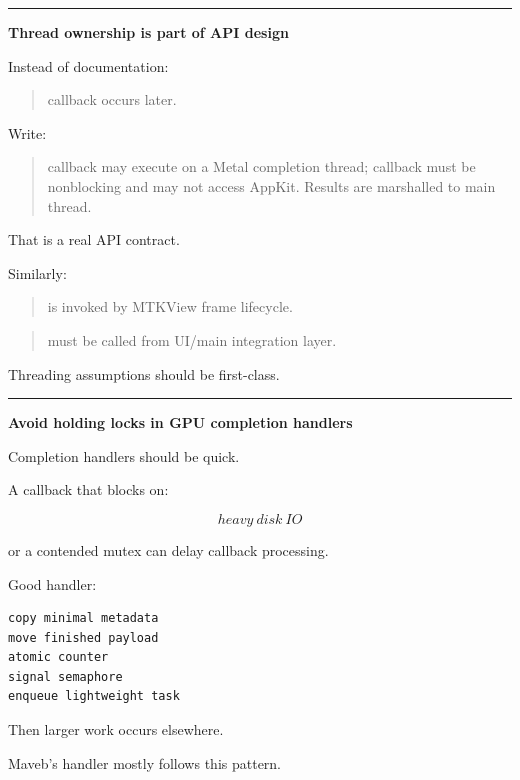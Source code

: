 \begin{center}\rule{0.5\linewidth}{0.5pt}\end{center}

\textbf{Thread ownership is part of API design}

Instead of documentation:

\begin{quote}
callback occurs later.
\end{quote}

Write:

\begin{quote}
callback may execute on a Metal completion thread; callback must be nonblocking and may not access AppKit. Results are marshalled to main thread.
\end{quote}

That is a real API contract.

Similarly:

\begin{quote}
 is invoked by MTKView frame lifecycle.
\end{quote}

\begin{quote}
 must be called from UI/main integration layer.
\end{quote}

Threading assumptions should be first-class.

\begin{center}\rule{0.5\linewidth}{0.5pt}\end{center}

\textbf{Avoid holding locks in GPU completion handlers}

Completion handlers should be quick.

A callback that blocks on:

\[
heavy\ disk\ IO
\]

or a contended mutex can delay callback processing.

Good handler:

\begin{verbatim}
copy minimal metadata
move finished payload
atomic counter
signal semaphore
enqueue lightweight task
\end{verbatim}

Then larger work occurs elsewhere.

Maveb's handler mostly follows this pattern.

